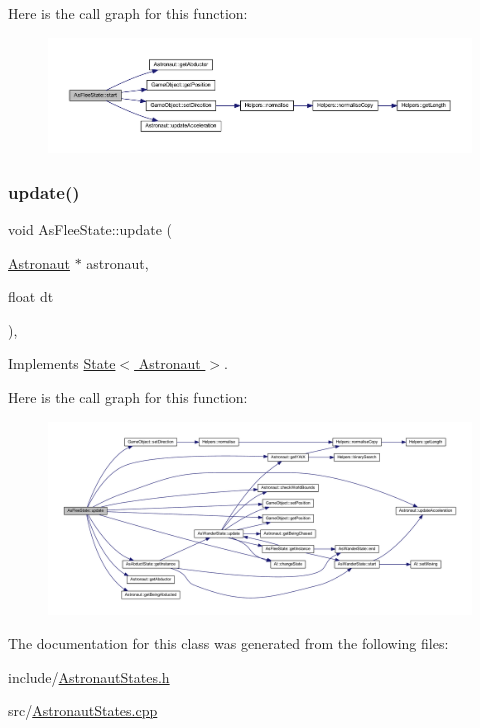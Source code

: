 Here is the call graph for this function\+:
\nopagebreak
\begin{figure}[H]
\begin{center}
\leavevmode
\includegraphics[width=350pt]{class_as_flee_state_a73dfdf7af46e5bce0b212030413cd00c_cgraph}
\end{center}
\end{figure}
\mbox{\label{class_as_flee_state_a2a6af75f427daa36c6e480f531e783ee}} 
\subsubsection{\texorpdfstring{update()}{update()}}
{\footnotesize\ttfamily void As\+Flee\+State\+::update (\begin{DoxyParamCaption}\item[{\hyperlink{class_astronaut}{Astronaut} $\ast$}]{astronaut,  }\item[{float}]{dt }\end{DoxyParamCaption})\hspace{0.3cm}{\ttfamily [override]}, {\ttfamily [virtual]}}



Implements \hyperlink{class_state_a30b5f87ed3e3a05fafeaf898e43518ea}{State$<$ Astronaut $>$}.

Here is the call graph for this function\+:
\nopagebreak
\begin{figure}[H]
\begin{center}
\leavevmode
\includegraphics[width=350pt]{class_as_flee_state_a2a6af75f427daa36c6e480f531e783ee_cgraph}
\end{center}
\end{figure}


The documentation for this class was generated from the following files\+:\begin{DoxyCompactItemize}
\item 
include/\hyperlink{_astronaut_states_8h}{Astronaut\+States.\+h}\item 
src/\hyperlink{_astronaut_states_8cpp}{Astronaut\+States.\+cpp}\end{DoxyCompactItemize}
